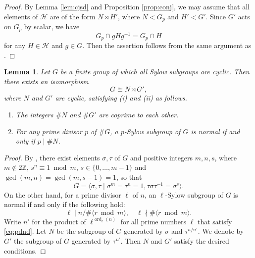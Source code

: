 \documentclass[12pt]{amsart}
\theoremstyle{plain}
\newtheorem{lem}[thm]{Lemma}
\theoremstyle{definition}
\numberwithin{thm}{section}
\numberwithin{equation}{section}
\newcommand{\Z}{\mathbb{Z}}
\newcommand{\cH}{\mathcal{H}}
\DeclareMathOperator{\ord}{ord}
\begin{document}
\begin{proof}
By Lemma \ref{lem:cjsd} and Proposition \ref{prop:conj}, we may assume that all elements of $\cH$ are of the form $N\rtimes H'$, where $N<G_{p}$ and $H'<G'$. Since $G'$ acts on $G_{p}$ by scalar, we have
\begin{equation*}
G_{p}\cap gHg^{-1}=G_{p}\cap H
\end{equation*}
for any $H\in \cH$ and $g\in G$. Then the assertion follows from the same argument as \cite[Lemma 8.3]{Hasegawa}. 
\end{proof}

\begin{lem}\label{lem:hall}
Let $G$ be a finite group of which all Sylow subgroups are cyclic. Then there exists an isomorphism
\begin{equation*}
G\cong N\rtimes G',
\end{equation*}
where $N$ and $G'$ are cyclic, satisfying \emph{(i)} and \emph{(ii)} as follows. 
\begin{enumerate}
\item The integers $\#N$ and $\#G'$ are coprime to each other. 
\item For any prime divisor $p$ of $\#G$, a $p$-Sylow subgroup of $G$ is normal if and only if $p\mid \#N$. 
\end{enumerate}
\end{lem}

\begin{proof}
By \cite[Theorem 9.4.3]{Hall1959}, there exist elements $\sigma,\tau$ of $G$ and positive integers $m,n,s$, where $m\notin 2\Z$, $s^{n}\equiv 1\bmod m$, $s\in \{0,\ldots,m-1\}$ and $\gcd(m,n)=\gcd(m,s-1)=1$, so that 
\begin{equation*}
    G=\langle \sigma,\tau\mid \sigma^{m}=\tau^{n}=1,\tau\sigma\tau^{-1}=\sigma^{s}\rangle. 
\end{equation*}
On the other hand, for a prime divisor $\ell$ of $n$, an $\ell$-Sylow subgroup of $G$ is normal if and only if the following hold: 
\begin{equation}\label{eq:pdnd}
    \ell\mid n/\#\langle r\bmod m\rangle,\quad \ell \nmid \#\langle r\bmod m\rangle. 
\end{equation}
Write $n'$ for the product of $\ell^{\ord_{\ell}(n)}$ for all prime numbers $\ell$ that satisfy \eqref{eq:pdnd}. Let $N$ be the subgroup of $G$ generated by $\sigma$ and $\tau^{n/n'}$. We denote by $G'$ the subgroup of $G$ generated by $\tau^{n'}$. Then $N$ and $G'$ satisfy the desired conditions. 
\end{proof}
\end{document}
